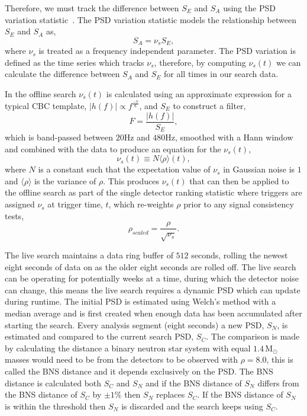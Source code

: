 Therefore, we must track the difference between $S_{E}$ and $S_{A}$ using the PSD variation statistic~\cite{PSD_var:2020}. The PSD variation statistic models the relationship between $S_{E}$ and $S_{A}$ as,
%
\begin{equation}
    S_{A} = \nu_{s} S_{E}, 
\end{equation}
%
where $\nu_{s}$ is treated as a frequency independent parameter. The PSD variation is defined as the time series which tracks $\nu_{s}$, therefore, by computing $\nu_{s}(t)$ we can calculate the difference between $S_{A}$ and $S_{E}$ for all times in our search data.

In the offline search $\nu_{s}(t)$ is calculated using an approximate expression for a typical CBC template, $|h(f)| \propto f^{\frac{-7}{6}}$, and $S_{E}$ to construct a filter,
%
\begin{equation}
    F = \frac{|h(f)|}{S_{E}} ,
    \label{5:eqn:psd-var-filter}
\end{equation}
%
which is band-passed between $20$Hz and $480$Hz, smoothed with a Hann window and combined with the data to produce an equation for the $\nu_{s}(t)$,
%
\begin{equation}
    \nu_{s}(t) \equiv N \langle \rho \rangle(t), 
\end{equation}
%
where $N$ is a constant such that the expectation value of $\nu_{s}$ in Gaussian noise is $1$ and $\langle\rho\rangle$ is the variance of $\rho$. This produces $\nu_{s}(t)$ that can then be applied to the offline search as part of the single detector ranking statistic where triggers are assigned $\nu_{s}$ at trigger time, $t$, which re-weights $\rho$ prior to any signal consistency tests,
%
\begin{equation}
    \rho_{scaled} = \frac{\rho}{\sqrt{\nu_{s}}} .
    \label{5:eqn:psd-var-snr-reweighting}
\end{equation}


The live search maintains a data ring buffer of $512$ seconds, rolling the newest eight seconds of data on as the older eight seconds are rolled off. The live search can be operating for potentially weeks at a time, during which the detector noise can change, this means the live search requires a dynamic PSD which can update during runtime. The initial PSD is estimated using Welch's method with a median average and is first created when enough data has been accumulated after starting the search. Every analysis segment (eight seconds) a new PSD, $S_{N}$, is estimated and compared to the current search PSD, $S_{C}$. The comparison is made by calculating the distance a binary neutron star system with equal $1.4 \, \text{M}_{\odot}$ masses would need to be from the detectors to be observed with $\rho = 8.0$, this is called the BNS distance and it depends exclusively on the PSD. The BNS distance is calculated both $S_{C}$ and $S_{N}$ and if the BNS distance of $S_{N}$ differs from the BNS distance of $S_{C}$ by $\pm1\%$ then $S_{N}$ replaces $S_{C}$. If the BNS distance of $S_{N}$ is within the threshold then $S_{N}$ is discarded and the search keeps using $S_{C}$.

